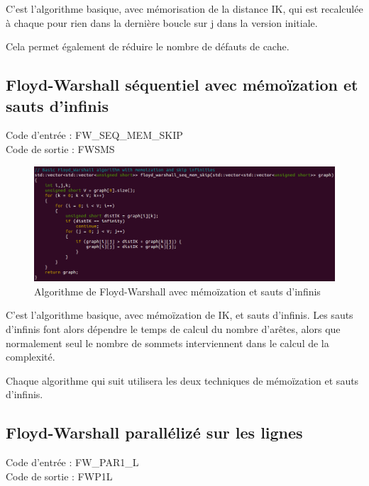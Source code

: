 \documentclass[a4paper,11pt]{article}
\begin{document}
C'est l'algorithme basique, avec mémorisation de la distance IK, qui est recalculée à chaque pour rien dans la dernière boucle sur j dans la version initiale.

Cela permet également de réduire le nombre de défauts de cache.

\subsection{Floyd-Warshall séquentiel avec mémoïzation et sauts d'infinis}

\noindent Code d'entrée : FW\_SEQ\_MEM\_SKIP \\
Code de sortie : FWSMS

\begin{figure}[H]
\begin{center}
  \includegraphics[scale=0.6]{FW_SEQ_MEM_SKIP.png}
  \caption{Algorithme de Floyd-Warshall avec mémoïzation et sauts d'infinis}
\end{center}
\end{figure}

C'est l'algorithme basique, avec mémoïzation de IK, et sauts d'infinis. Les sauts d'infinis font alors dépendre le temps de calcul du nombre d'arêtes, alors que normalement seul le nombre de sommets interviennent dans le calcul de la complexité.

Chaque algorithme qui suit utilisera les deux techniques de mémoïzation et sauts d'infinis.

\subsection{Floyd-Warshall parallélizé sur les lignes}

\noindent Code d'entrée : FW\_PAR1\_L \\
Code de sortie : FWP1L
\end{document}
